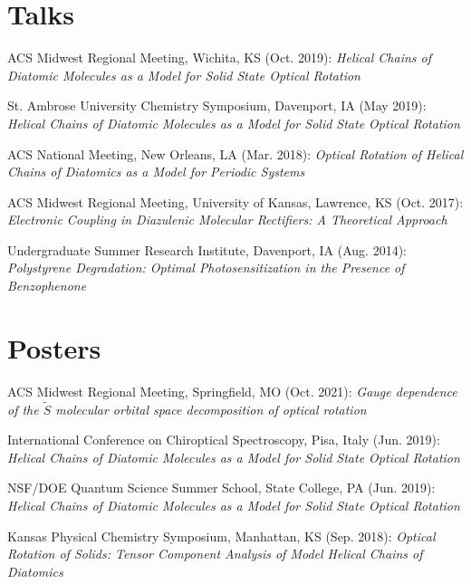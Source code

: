 \documentclass[a4paper,11pt]{article}
\begin{document}
\vspace{-5pt}
\section{Talks}
\begin{etaremune}



\item ACS Midwest Regional Meeting, Wichita, KS (Oct. 2019): \textit{Helical Chains of Diatomic Molecules as a Model for Solid State Optical Rotation} 


\item St. Ambrose University Chemistry Symposium, Davenport, IA (May 2019): \textit{Helical Chains of Diatomic Molecules as a Model for Solid State Optical Rotation}  

\item ACS National Meeting, New Orleans, LA (Mar. 2018): \textit{Optical Rotation of Helical Chains of Diatomics as a Model for Periodic Systems} 

\item ACS Midwest Regional Meeting, University of Kansas, Lawrence, KS (Oct. 2017): \textit{Electronic Coupling in Diazulenic Molecular Rectifiers: A Theoretical Approach} 

\item Undergraduate Summer Research Institute, Davenport, IA (Aug. 2014): \textit{Polystyrene Degradation: Optimal Photosensitization in the Presence of Benzophenone} 
\end{etaremune}	    
	    
\vspace{-5pt}
\section{Posters}
\begin{etaremune}


\item ACS Midwest Regional Meeting, Springfield, MO (Oct. 2021): \textit{Gauge dependence of the $\tilde{S}$ molecular orbital space decomposition of optical rotation} 

\item International Conference on Chiroptical Spectroscopy, Pisa, Italy (Jun. 2019): \textit{Helical Chains of Diatomic Molecules as a Model for Solid State Optical Rotation}  

\item NSF/DOE Quantum Science Summer School, State College, PA (Jun. 2019): \textit{Helical Chains of Diatomic Molecules as a Model for Solid State Optical Rotation}  

\item Kansas Physical Chemistry Symposium, Manhattan, KS (Sep. 2018): \textit{Optical Rotation of Solids: Tensor Component Analysis of Model Helical Chains of Diatomics}

\end{etaremune}	    
    
\end{document}
